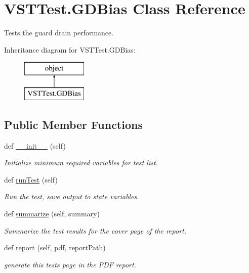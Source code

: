 \hypertarget{class_v_s_t_test_1_1_g_d_bias}{}\section{V\+S\+T\+Test.\+G\+D\+Bias Class Reference}
\label{class_v_s_t_test_1_1_g_d_bias}


Tests the guard drain performance.  


Inheritance diagram for V\+S\+T\+Test.\+G\+D\+Bias\+:\begin{figure}[H]
\begin{center}
\leavevmode
\includegraphics[height=2.000000cm]{class_v_s_t_test_1_1_g_d_bias}
\end{center}
\end{figure}
\subsection*{Public Member Functions}
\begin{DoxyCompactItemize}
\item 
def \hyperlink{class_v_s_t_test_1_1_g_d_bias_ae5f6661aa67e963b252893b33f7e48ed}{\+\_\+\+\_\+init\+\_\+\+\_\+} (self)
\begin{DoxyCompactList}\small\item\em Initialize minimum required variables for test list. \end{DoxyCompactList}\item 
def \hyperlink{class_v_s_t_test_1_1_g_d_bias_a7dab9741796cca9bc33aa0e28783a3f6}{run\+Test} (self)
\begin{DoxyCompactList}\small\item\em Run the test, save output to state variables. \end{DoxyCompactList}\item 
def \hyperlink{class_v_s_t_test_1_1_g_d_bias_a0a6175514ae3959b21b466d9e41e1976}{summarize} (self, summary)
\begin{DoxyCompactList}\small\item\em Summarize the test results for the cover page of the report. \end{DoxyCompactList}\item 
def \hyperlink{class_v_s_t_test_1_1_g_d_bias_ae2a38caef0c13f8e14a4e5157c7e257d}{report} (self, pdf, report\+Path)
\begin{DoxyCompactList}\small\item\em generate this test\textquotesingle{}s page in the P\+DF report. \end{DoxyCompactList}\end{DoxyCompactItemize}


